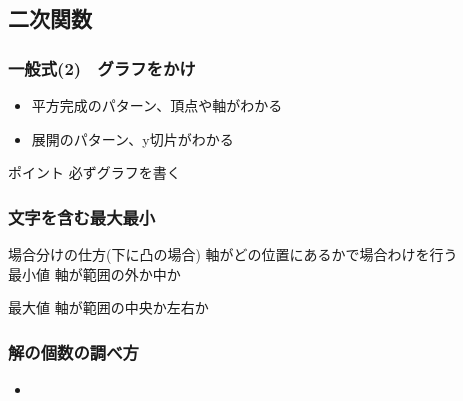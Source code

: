 \documentclass[10pt,dvipdfmx]{jsarticle}
\newcommand{\answer}[2]{{\color{orange}#2}}
\newcommand{\answer}[2]{\vspace{#1mm}}
\begin{document}
\newpage
\subsection*{二次関数}
\subsubsection*{一般式(2)　グラフをかけ}
\begin{large}
  \begin{itemize}
    \item \answer{0}{平方完成のパターン、頂点や軸がわかる}
    \item \answer{0}{展開のパターン、y切片がわかる}
  \end{itemize}
\end{large}

\begin{itembox}[l]{ポイント}
  \answer{8}{必ずグラフを書く}
\end{itembox}



\subsubsection*{文字を含む最大最小}
\begin{itembox}[l]{場合分けの仕方(下に凸の場合)}
  \answer{0}{軸がどの位置にあるかで場合わけを行う\\}
  最小値
  \answer{50}{
    軸が範囲の外か中か
  }

  最大値
  \answer{50}{軸が範囲の中央か左右か}


\end{itembox}

\subsubsection*{解の個数の調べ方}
\begin{large}
  \begin{itemize}
    \item
  \end{itemize}
\end{large}
\end{document}
